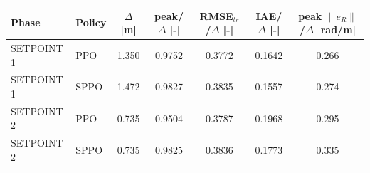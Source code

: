 \begin{tabular}{llccccc}
\toprule
Phase & Policy & $\Delta$ [m] & peak/$\Delta$ [-] & RMSE$_{tr}$/$\Delta$ [-] & IAE/$\Delta$ [-] & peak $\|e_R\|$/$\Delta$ [rad/m] \\
\midrule
SETPOINT 1 & PPO & 1.350 & 0.9752 & 0.3772 & 0.1642 & 0.266 \\
SETPOINT 1 & SPPO & 1.472 & 0.9827 & 0.3835 & 0.1557 & 0.274 \\
\midrule
SETPOINT 2 & PPO & 0.735 & 0.9504 & 0.3787 & 0.1968 & 0.295 \\
SETPOINT 2 & SPPO & 0.735 & 0.9825 & 0.3836 & 0.1773 & 0.335 \\
\bottomrule
\end{tabular}
